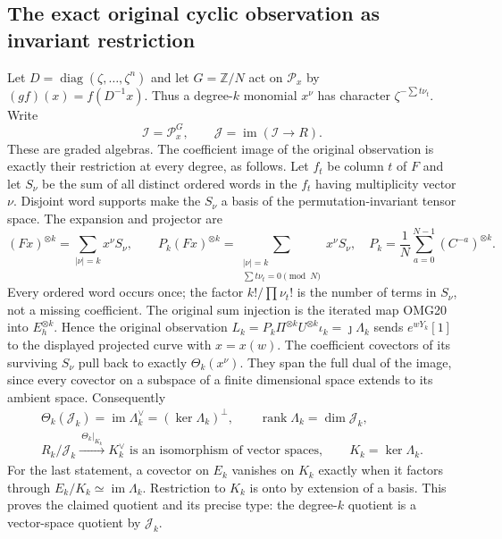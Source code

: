 \documentclass[11pt,a4paper]{article}
\begin{document}
\subsection{The exact original cyclic observation as invariant restriction}
Let $D=\operatorname{diag}(\zeta,\ldots,\zeta^n)$ and let
$G=\mathbb Z/N$ act on $\mathscr P_x$ by
$(g f)(x)=f(D^{-1}x)$. Thus a degree-$k$ monomial $x^\nu$
has character $\zeta^{-\sum t\nu_t}$. Write
\[
 \mathscr I=\mathscr P_x^G,\qquad
 \mathscr J=\operatorname{im}(\mathscr I\longrightarrow R).
 \tag{OMG28}
\]
These are graded algebras. The coefficient image of the original
observation is exactly their restriction at every degree, as follows.
Let $f_t$ be column $t$ of $F$ and let $S_\nu$ be the sum of
all distinct ordered words in the $f_t$ having multiplicity vector
$\nu$. Disjoint word supports make the $S_\nu$ a basis of the
permutation-invariant tensor space. The expansion and projector are
\[
 (Fx)^{\otimes k}=\sum_{|\nu|=k}x^\nu S_\nu,\qquad
 P_k(Fx)^{\otimes k}=\sum_{\substack{|\nu|=k\\\sum t\nu_t=0\pmod N}}
                    x^\nu S_\nu,\quad
 P_k=\frac1N\sum_{a=0}^{N-1}(C^{-a})^{\otimes k}.
\]
Every ordered word occurs once; the factor $k!/\prod\nu_t!$ is
the number of terms in $S_\nu$, not a missing coefficient.
The original sum injection is the iterated map OMG20 into
$E_h^{\otimes k}$. Hence the original observation
$L_k=P_k\Pi^{\otimes k}U^{\otimes k}\iota_k=\jmath\Lambda_k$
sends $e^{wY_k}[1]$ to the displayed projected curve with $x=x(w)$.
The coefficient covectors of its surviving $S_\nu$ pull back to
exactly $\Theta_k(x^\nu)$. They span the full dual of the image,
since every covector on a subspace of a finite dimensional space
extends to its ambient space. Consequently
\[
\boxed{\begin{gathered}
 \Theta_k(\mathscr J_k)=\operatorname{im}\Lambda_k^\vee
                          =(\ker\Lambda_k)^\perp,\qquad
 \operatorname{rank}\Lambda_k=\dim\mathscr J_k,\\
 R_k/\mathscr J_k\xrightarrow{\ \Theta_k|_{K_k}\ }K_k^\vee
       \text{ is an isomorphism of vector spaces},\qquad
 K_k=\ker\Lambda_k.
\end{gathered}}\tag{OMG29}
\]
For the last statement, a covector on $E_k$ vanishes on $K_k$
exactly when it factors through $E_k/K_k\simeq\operatorname{im}
\Lambda_k$. Restriction to $K_k$ is onto by extension of a basis.
This proves the claimed quotient and its precise type: the
degree-$k$ quotient is a vector-space quotient by $\mathscr J_k$.
\end{document}
